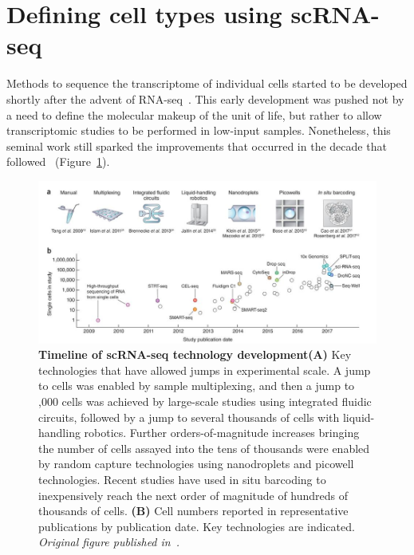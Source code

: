 \section{Defining cell types using scRNA-seq} %
\label{section1.2}

Methods to sequence the transcriptome of individual cells started to be developed shortly after the advent of RNA-seq~\citep{mortazavi_mapping_2008,tang_mrna-seq_2009}. This early development was pushed not by a need to define the molecular makeup of the unit of life, but rather to allow transcriptomic studies to be performed in low-input samples. Nonetheless, this seminal work still sparked the improvements that occurred in the decade that followed~\citep{svensson_exponential_2018} (Figure~\ref{fig:chap1_fig1}).

\begin{figure}[ht!]
    \centering    
    \includegraphics[width=1.0\textwidth]{Chapter1/Figs/chap1_fig1.jpg} %
    \caption[Timeline of scRNA-seq technology development]{\textbf{Timeline of scRNA-seq technology development}\newline\textbf{(A)} Key technologies that have allowed jumps in experimental scale. A jump to  cells was enabled by sample multiplexing, and then a jump to ,000 cells was achieved by large-scale studies using integrated fluidic circuits, followed by a jump to several thousands of cells with liquid-handling robotics. Further orders-of-magnitude increases bringing the number of cells assayed into the tens of thousands were enabled by random capture technologies using nanodroplets and picowell technologies. Recent studies have used in situ barcoding to inexpensively reach the next order of magnitude of hundreds of thousands of cells. \textbf{(B)} Cell numbers reported in representative publications by publication date. Key technologies are indicated. \textit{Original figure published in~\citep{svensson_exponential_2018}.}}
    \label{fig:chap1_fig1}
\end{figure}

